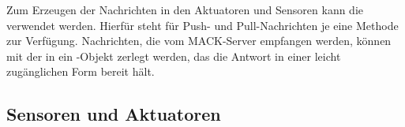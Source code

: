 Zum Erzeugen der Nachrichten in den Aktuatoren und Sensoren kann die  verwendet werden. Hierfür steht für Push- und Pull-Nachrichten je eine Methode zur Verfügung. Nachrichten, die vom MACK-Server empfangen werden, können mit der  in ein -Objekt zerlegt werden, das die Antwort in einer leicht zugänglichen Form bereit hält.

\subsection{Sensoren und Aktuatoren}\label{subsec:real_sensors}




%
%
%
%

